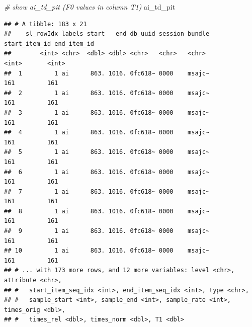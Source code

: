 \documentclass[]{book}
\newenvironment{Shaded}{\begin{snugshade}}{\end{snugshade}}
\newcommand{\CommentTok}[1]{\textcolor[rgb]{0.56,0.35,0.01}{\textit{#1}}}
\newcommand{\NormalTok}[1]{#1}
\begin{document}
\begin{Shaded}
\begin{Highlighting}[]
\CommentTok{# show ai_td_pit (F0 values in column T1)}
\NormalTok{ai_td_pit}
\end{Highlighting}
\end{Shaded}

\begin{verbatim}
## # A tibble: 183 x 21
##    sl_rowIdx labels start   end db_uuid session bundle start_item_id end_item_id
##        <int> <chr>  <dbl> <dbl> <chr>   <chr>   <chr>          <int>       <int>
##  1         1 ai      863. 1016. 0fc618~ 0000    msajc~           161         161
##  2         1 ai      863. 1016. 0fc618~ 0000    msajc~           161         161
##  3         1 ai      863. 1016. 0fc618~ 0000    msajc~           161         161
##  4         1 ai      863. 1016. 0fc618~ 0000    msajc~           161         161
##  5         1 ai      863. 1016. 0fc618~ 0000    msajc~           161         161
##  6         1 ai      863. 1016. 0fc618~ 0000    msajc~           161         161
##  7         1 ai      863. 1016. 0fc618~ 0000    msajc~           161         161
##  8         1 ai      863. 1016. 0fc618~ 0000    msajc~           161         161
##  9         1 ai      863. 1016. 0fc618~ 0000    msajc~           161         161
## 10         1 ai      863. 1016. 0fc618~ 0000    msajc~           161         161
## # ... with 173 more rows, and 12 more variables: level <chr>, attribute <chr>,
## #   start_item_seq_idx <int>, end_item_seq_idx <int>, type <chr>,
## #   sample_start <int>, sample_end <int>, sample_rate <int>, times_orig <dbl>,
## #   times_rel <dbl>, times_norm <dbl>, T1 <dbl>
\end{verbatim}
\end{document}
